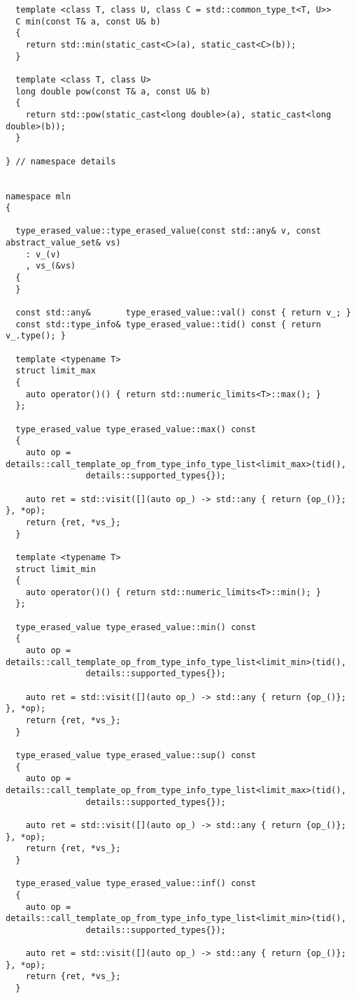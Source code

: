 \begin{verbatim}
  template <class T, class U, class C = std::common_type_t<T, U>>
  C min(const T& a, const U& b)
  {
    return std::min(static_cast<C>(a), static_cast<C>(b));
  }

  template <class T, class U>
  long double pow(const T& a, const U& b)
  {
    return std::pow(static_cast<long double>(a), static_cast<long double>(b));
  }

} // namespace details


namespace mln
{

  type_erased_value::type_erased_value(const std::any& v, const abstract_value_set& vs)
    : v_(v)
    , vs_(&vs)
  {
  }

  const std::any&       type_erased_value::val() const { return v_; }
  const std::type_info& type_erased_value::tid() const { return v_.type(); }

  template <typename T>
  struct limit_max
  {
    auto operator()() { return std::numeric_limits<T>::max(); }
  };

  type_erased_value type_erased_value::max() const
  {
    auto op = details::call_template_op_from_type_info_type_list<limit_max>(tid(),
                details::supported_types{});

    auto ret = std::visit([](auto op_) -> std::any { return {op_()}; }, *op);
    return {ret, *vs_};
  }

  template <typename T>
  struct limit_min
  {
    auto operator()() { return std::numeric_limits<T>::min(); }
  };

  type_erased_value type_erased_value::min() const
  {
    auto op = details::call_template_op_from_type_info_type_list<limit_min>(tid(),
                details::supported_types{});

    auto ret = std::visit([](auto op_) -> std::any { return {op_()}; }, *op);
    return {ret, *vs_};
  }

  type_erased_value type_erased_value::sup() const
  {
    auto op = details::call_template_op_from_type_info_type_list<limit_max>(tid(),
                details::supported_types{});

    auto ret = std::visit([](auto op_) -> std::any { return {op_()}; }, *op);
    return {ret, *vs_};
  }

  type_erased_value type_erased_value::inf() const
  {
    auto op = details::call_template_op_from_type_info_type_list<limit_min>(tid(),
                details::supported_types{});

    auto ret = std::visit([](auto op_) -> std::any { return {op_()}; }, *op);
    return {ret, *vs_};
  }


\end{verbatim}
